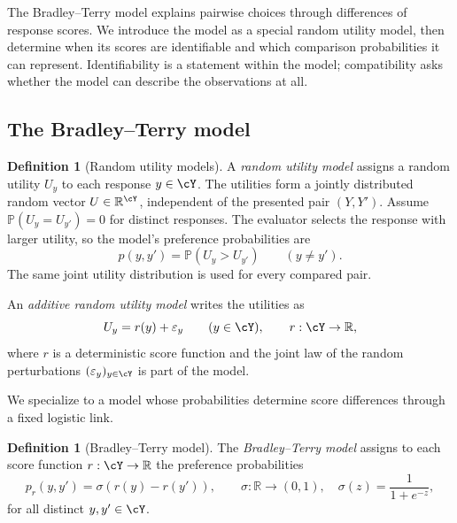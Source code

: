 \documentclass[11pt,twoside]{article}
\renewcommand{\P}{\mathbb P}
\newcommand{\R}{\mathbb R}
\theoremstyle{definition}
\newtheorem{definition}[theorem]{Definition}
\theoremstyle{remark}
\begin{document}
The Bradley--Terry model explains pairwise choices through differences of
response scores. We introduce the model as a special random utility model,
then determine when its scores are identifiable and which comparison
probabilities it can represent.
Identifiability is a statement within the model; compatibility asks whether
the model can describe the observations at all.

\subsection{The Bradley--Terry model}

\begin{definition}[Random utility models]
\label{def:random-utility}
A \emph{random utility model} assigns a random utility $U_y$ to each
response $y\in\cY$. The utilities form a jointly distributed random vector
$U\in\R^{\cY}$, independent of the presented pair $(Y,Y')$. Assume
$\P(U_y=U_{y'})=0$ for distinct responses. The evaluator selects the
response with larger utility, so the model's preference probabilities are
\[
 p(y,y')=\P(U_y>U_{y'})\qquad(y\ne y').
\]
The same joint utility distribution is used for every compared pair.

An \emph{additive random utility model} writes the utilities as
\[
 U_y=r(y)+\varepsilon_y\qquad(y\in\cY),\qquad r:\cY\to\R,
\]
where $r$ is a deterministic score function and the joint law of the random
perturbations $(\varepsilon_y)_{y\in\cY}$ is part of the model.
\end{definition}

We specialize to a model whose probabilities determine score differences
through a fixed logistic link.

\begin{definition}[Bradley--Terry model]
\label{def:bradley-terry}
The \emph{Bradley--Terry model} assigns to each score function
$r:\cY\to\R$ the preference probabilities
\begin{equation}
 p_r(y,y')=\sigma(r(y)-r(y')),
 \qquad \sigma:\R\to(0,1),\quad \sigma(z)=\frac{1}{1+e^{-z}},
 \label{eq:bt}
\end{equation}
for all distinct $y,y'\in\cY$.
\end{definition}
\end{document}
